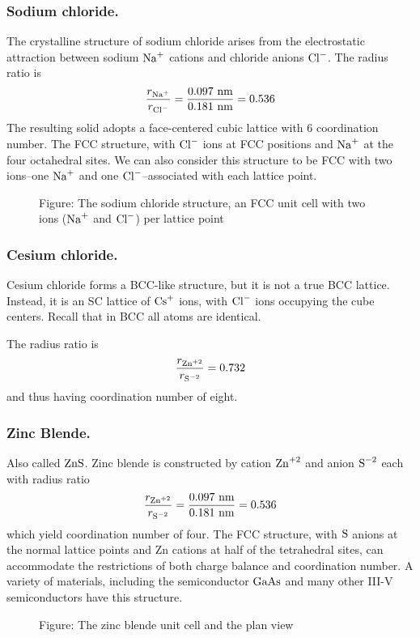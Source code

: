 \documentclass[../../../main.tex]{subfiles}
\begin{document}
\subsubsection{Sodium chloride.}
The crystalline structure of sodium chloride arises from the electrostatic attraction between sodium $\ce{Na+}$ cations and chloride anions $\ce{Cl-}$.
The radius ratio is
\begin{equation*}
    \frac{r_{\ce{Na+ }}}{r_{\ce{Cl-}}}=\frac{0.097 \text{ nm}}{0.181 \text{ nm}}=0.536
\end{equation*}
The resulting solid adopts a face-centered cubic lattice with 6 coordination number.
The FCC structure, with $\ce{Cl-}$ ions at FCC positions and $\ce{Na+}$ at the four octahedral sites.
We can also consider this structure to be FCC with two ions--one $\ce{Na+}$ and one $\ce{Cl-}$--associated with each lattice point.
\begin{figure}[]
    \centering
    \caption*{Figure: The sodium chloride structure, an FCC unit cell with two ions ($\ce{Na+}$ and $\ce{Cl-}$) per lattice point}
\end{figure}

\subsubsection{Cesium chloride.}
Cesium chloride forms a BCC-like structure, but it is not a true BCC lattice.
Instead, it is an SC lattice of $\ce{Cs+}$ ions, with $\ce{Cl-}$ ions occupying the cube centers.
Recall that in BCC all atoms are identical.

The radius ratio is
\begin{equation*}
    \frac{r_{\ce{Zn^{+2} }}}{r_{\ce{S^{-2}}}}=0.732
\end{equation*}
and thus having coordination number of eight.

\subsubsection{Zinc Blende.}
Also called $\ce{ZnS}$.
Zinc blende is constructed by cation $\ce{Zn^{+2}}$ and anion $\ce{S^{-2}}$ each with radius ratio
\begin{equation*}
    \frac{r_{\ce{Zn^{+2} }}}{r_{\ce{S^{-2}}}}=\frac{0.097 \text{ nm}}{0.181 \text{ nm}}=0.536
\end{equation*}
which yield coordination number of four.
The FCC structure, with $\ce{S}$ anions at the normal lattice points and Zn cations at half of the tetrahedral sites, can accommodate the restrictions of both charge balance and coordination number.
A variety of materials, including the semiconductor $\ce{GaAs}$ and many other III-V semiconductors have this structure.
\begin{figure}[]
    \centering
    \caption*{Figure: The zinc blende unit cell and the plan view}
\end{figure}
\end{document}
